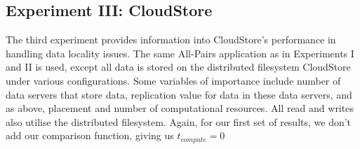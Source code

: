 \documentclass{rspublic}
\begin{document}
\vspace{-0.3cm}

\subsection{Experiment III: CloudStore}\label{Sec:CloudStoreExp}
The third experiment provides information into CloudStore's performance
in handling data locality issues. The same All-Pairs application as in
Experiments I and II is used, except all data is stored on the
distributed filesystem CloudStore under various configurations. Some
variables of importance include number of data servers that store data,
replication value for data in these data servers, and as above,
placement and number of computational resources. All read and writes
also utilise the distributed filesystem. Again, for our first set of
results, we don't add our comparison function, giving us
$t_{compute}=0$ 
\end{document}
